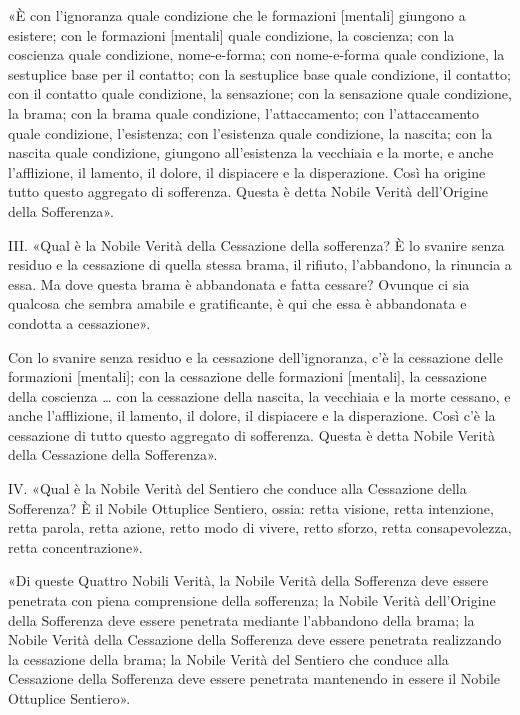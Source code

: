 

«È con l’ignoranza quale condizione che le formazioni [mentali] giungono
a esistere; con le formazioni [mentali] quale condizione, la coscienza;
con la coscienza quale condizione, nome-e-forma; con nome-e-forma quale
condizione, la sestuplice base per il contatto; con la sestuplice base
quale condizione, il contatto; con il contatto quale condizione, la
sensazione; con la sensazione quale condizione, la brama; con la brama
quale condizione, l’attaccamento; con l’attaccamento quale condizione,
l’esistenza; con l’esistenza quale condizione, la nascita; con la
nascita quale condizione, giungono all’esistenza la vecchiaia e la
morte, e anche l’afflizione, il lamento, il dolore, il dispiacere e la
disperazione. Così ha origine tutto questo aggregato di sofferenza.
Questa è detta Nobile Verità dell’Origine della Sofferenza».




III. «Qual è la Nobile Verità della Cessazione della sofferenza? È lo
svanire senza residuo e la cessazione di quella stessa brama, il
rifiuto, l’abbandono, la rinuncia a essa. Ma dove questa brama è
abbandonata e fatta cessare? Ovunque ci sia qualcosa che sembra amabile
e gratificante, è qui che essa è abbandonata e condotta a cessazione».




Con lo svanire senza residuo e la cessazione dell’ignoranza, c’è la
cessazione delle formazioni [mentali]; con la cessazione delle
formazioni [mentali], la cessazione della coscienza … con la cessazione
della nascita, la vecchiaia e la morte cessano, e anche l’afflizione, il
lamento, il dolore, il dispiacere e la disperazione. Così c’è la
cessazione di tutto questo aggregato di sofferenza. Questa è detta
Nobile Verità della Cessazione della Sofferenza».




IV. «Qual è la Nobile Verità del Sentiero che conduce alla Cessazione
della Sofferenza? È il Nobile Ottuplice Sentiero, ossia: retta visione,
retta intenzione, retta parola, retta azione, retto modo di vivere,
retto sforzo, retta consapevolezza, retta concentrazione».




«Di queste Quattro Nobili Verità, la Nobile Verità della Sofferenza deve
essere penetrata con piena comprensione della sofferenza; la Nobile
Verità dell’Origine della Sofferenza deve essere penetrata mediante
l’abbandono della brama; la Nobile Verità della Cessazione della
Sofferenza deve essere penetrata realizzando la cessazione della brama;
la Nobile Verità del Sentiero che conduce alla Cessazione della
Sofferenza deve essere penetrata mantenendo in essere il Nobile
Ottuplice Sentiero».


